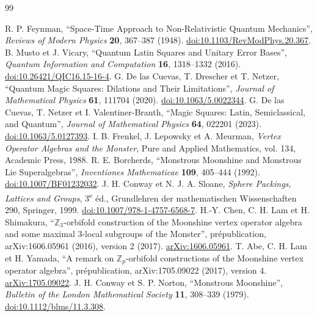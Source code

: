 \begin{thebibliography}{99}
\fontsize{9}{10.8}\selectfont
\setlength{\itemsep}{2.5pt}
\setlength{\parskip}{0pt}
\raggedright
{}
{}
 R. P. Feynman, ``Space-Time Approach to Non-Relativistic Quantum Mechanics'', \emph{Reviews of Modern Physics} \textbf{20}, 367--387 (1948). \href{https://doi.org/10.1103/RevModPhys.20.367}{doi:10.1103/RevModPhys.20.367}.
 B. Musto et J. Vicary, ``Quantum Latin Squares and Unitary Error Bases'', \emph{Quantum Information and Computation} \textbf{16}, 1318--1332 (2016). \href{https://doi.org/10.26421/QIC16.15-16-4}{doi:10.26421/QIC16.15-16-4}.
 G. De las Cuevas, T. Drescher et T. Netzer, ``Quantum Magic Squares: Dilations and Their Limitations'', \emph{Journal of Mathematical Physics} \textbf{61}, 111704 (2020). \href{https://doi.org/10.1063/5.0022344}{doi:10.1063/5.0022344}.
 G. De las Cuevas, T. Netzer et I. Valentiner-Branth, ``Magic Squares: Latin, Semiclassical, and Quantum'', \emph{Journal of Mathematical Physics} \textbf{64}, 022201 (2023). \href{https://doi.org/10.1063/5.0127393}{doi:10.1063/5.0127393}.
 I. B. Frenkel, J. Lepowsky et A. Meurman, \emph{Vertex Operator Algebras and the Monster}, Pure and Applied Mathematics, vol. 134, Academic Press, 1988.
 R. E. Borcherds, ``Monstrous Moonshine and Monstrous Lie Superalgebras'', \emph{Inventiones Mathematicae} \textbf{109}, 405--444 (1992). \href{https://doi.org/10.1007/BF01232032}{doi:10.1007/BF01232032}.
 J. H. Conway et N. J. A. Sloane, \emph{Sphere Packings, Lattices and Groups}, 3\textsuperscript{e} éd., Grundlehren der mathematischen Wissenschaften 290, Springer, 1999. \href{https://doi.org/10.1007/978-1-4757-6568-7}{doi:10.1007/978-1-4757-6568-7}.
 H.-Y. Chen, C. H. Lam et H. Shimakura, ``\(\mathbb Z_3\)-orbifold construction of the Moonshine vertex operator algebra and some maximal \(3\)-local subgroups of the Monster'', prépublication, arXiv:1606.05961 (2016), version 2 (2017). \href{https://arxiv.org/abs/1606.05961}{arXiv:1606.05961}.
 T. Abe, C. H. Lam et H. Yamada, ``A remark on \(\mathbb Z_p\)-orbifold constructions of the Moonshine vertex operator algebra'', prépublication, arXiv:1705.09022 (2017), version 4. \href{https://arxiv.org/abs/1705.09022v4}{arXiv:1705.09022}.
 J. H. Conway et S. P. Norton, ``Monstrous Moonshine'', \emph{Bulletin of the London Mathematical Society} \textbf{11}, 308--339 (1979). \href{https://doi.org/10.1112/blms/11.3.308}{doi:10.1112/blms/11.3.308}.

\end{thebibliography}
